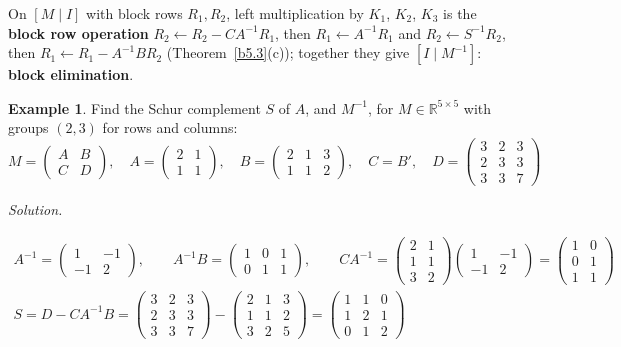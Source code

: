 \documentclass[12pt]{article}
\newcommand{\R}{\mathbb R}
\newcommand{\C}{\mathbb C}
\theoremstyle{definition}
\newtheorem{example}[theorem]{Example}
\begin{document}
On \([M\mid I]\) with block rows \(R_1,R_2\), left multiplication by \(K_1\), \(K_2\), \(K_3\) is the \textbf{block row
operation} \(R_2\leftarrow R_2-CA^{-1}R_1\), then \(R_1\leftarrow A^{-1}R_1\) and \(R_2\leftarrow S^{-1}R_2\), then
\(R_1\leftarrow R_1-A^{-1}BR_2\) (Theorem~\ref{b5.3}(c)); together they give \([I\mid M^{-1}]\): \textbf{block elimination}.

\begin{example}\label{b5.11}
Find the Schur complement \(S\) of \(A\), and \(M^{-1}\), for \(M\in\R^{5\times5}\) with groups \((2,3)\) for rows and
columns:
\[
M=\begin{pmatrix}A&B\\C&D\end{pmatrix},\quad A=\begin{pmatrix}2&1\\1&1\end{pmatrix},\quad
B=\begin{pmatrix}2&1&3\\1&1&2\end{pmatrix},\quad C=B',\quad D=\begin{pmatrix}3&2&3\\2&3&3\\3&3&7\end{pmatrix}
\]
\end{example}
\textit{Solution.}
\begin{board}[\(A^{-1}\) (\lec{2}, \lit{Proposition~17}: \(2\cdot1-1\cdot1=1\)); \(A^{-1}B\), \(CA^{-1}\); \(S\) (Theorem~\ref{b5.9}):]
\[
\begin{gathered}
A^{-1}=\begin{pmatrix}1&-1\\-1&2\end{pmatrix},\qquad
A^{-1}B=\begin{pmatrix}1&0&1\\0&1&1\end{pmatrix},\qquad
CA^{-1}=\begin{pmatrix}2&1\\1&1\\3&2\end{pmatrix}\begin{pmatrix}1&-1\\-1&2\end{pmatrix}=\begin{pmatrix}1&0\\0&1\\1&1\end{pmatrix}\\
S=D-CA^{-1}B=\begin{pmatrix}3&2&3\\2&3&3\\3&3&7\end{pmatrix}-\begin{pmatrix}2&1&3\\1&1&2\\3&2&5\end{pmatrix}
=\begin{pmatrix}1&1&0\\1&2&1\\0&1&2\end{pmatrix}
\end{gathered}
\]
\end{board}
\end{document}
